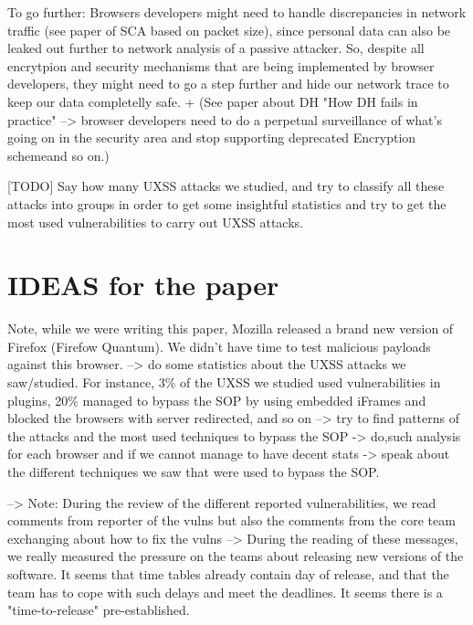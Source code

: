 \documentclass[journal]{IEEEtran}
\begin{document}
To go further: Browsers developers might need to handle discrepancies in network traffic (see paper of SCA based on packet size), since personal data can also be leaked out further to network analysis of a passive attacker. So, despite all encrytpion and security mechanisms that are being implemented by browser developers, they might need to go a step further and hide our network trace to keep our data completelly safe. + (See paper about DH "How DH fails in practice" --> browser developers need to do a perpetual surveillance of what's going on in the security area and stop supporting deprecated Encryption schemeand so on.)

[TODO]
Say how many UXSS attacks we studied, and try to classify all these attacks into groups in order to get some insightful statistics and try to get the most used vulnerabilities to carry out UXSS attacks.



\section{IDEAS for the paper}
Note, while we were writing this paper, Mozilla released a brand new version of Firefox (Firefow Quantum). We didn't have time to test malicious payloads against this browser.
--> do some statistics about the UXSS attacks we saw/studied. For instance, 3\% of the UXSS we studied used vulnerabilities in plugins, 20\% managed to bypass the SOP by using embedded iFrames and blocked the browsers with server redirected, and so on --> try to find patterns of the attacks and the most used techniques to bypass the SOP -> do,such analysis for each browser and if we cannot manage to have decent stats -> speak about the different techniques we saw that were used to bypass the SOP.


--> Note: During the review of the different reported vulnerabilities, we read comments from reporter of the vulns but also the comments from the core team exchanging about how to fix the vulns --> During the reading of these messages, we really measured the pressure on the teams about releasing new versions of the software. It seems that time tables already contain day of release, and that the team has to cope with such delays and meet the deadlines. It seems there is a "time-to-release" pre-established.  

\end{document}
